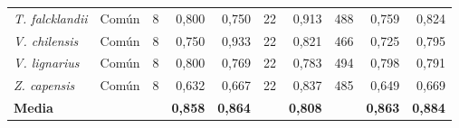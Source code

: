 {\begin{longtable}{@{}l l r r r r r r r r@{}}
    \textit{T. falcklandii} & Común & 8 & 0,800 & 0,750 & 22 & 0,913 & 488 & 0,759 & 0,824 \\
    \textit{V. chilensis} & Común & 8 & 0,750 & 0,933 & 22 & 0,821 & 466 & 0,725 & 0,795 \\
    \textit{V. lignarius} & Común & 8 & 0,800 & 0,769 & 22 & 0,783 & 494 & 0,798 & 0,791 \\
    \textit{Z. capensis} & Común & 8 & 0,632 & 0,667 & 22 & 0,837 & 485 & 0,649 & 0,669 \\
  \midrule
    \textbf{Media} &  &  & \textbf{0,858} & \textbf{0,864} &  & \textbf{0,808} &  & \textbf{0,863} & \textbf{0,884} \\
\end{longtable}}
